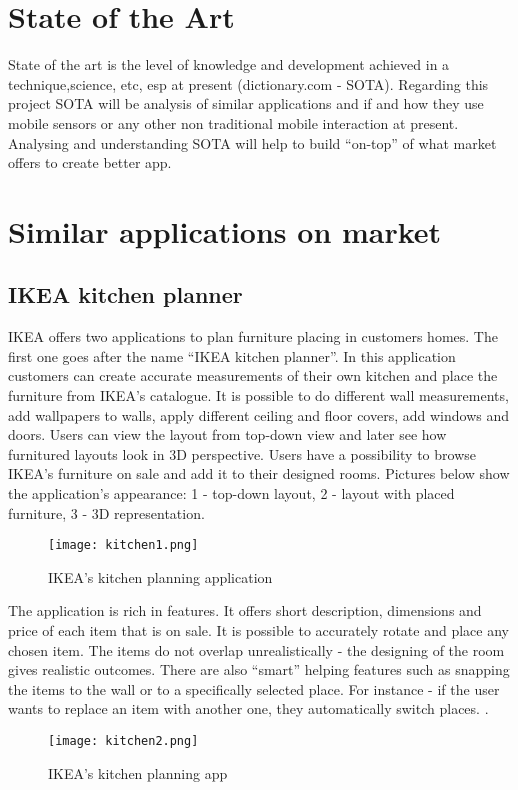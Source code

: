 \section{State of the Art}

State of the art is the level of knowledge and development achieved in a technique,science, etc, esp at present (dictionary.com - SOTA). Regarding this project SOTA will be analysis of similar applications and if and how they use mobile sensors or any other non traditional mobile interaction at present.  Analysing and understanding SOTA will help to build “on-top” of what market offers to create better app. 

\section{Similar applications on market} 
\subsection{IKEA kitchen planner}
IKEA offers two applications to plan furniture placing in customers homes. The first one goes after the name “IKEA kitchen planner”. In this application customers can create accurate measurements of their own kitchen and place the furniture from IKEA’s catalogue. It is possible to do different wall measurements, add wallpapers to walls, apply different ceiling and floor covers, add windows and doors. Users can view the layout from top-down view and later see how furnitured layouts look in 3D perspective.
Users have a possibility to browse IKEA’s furniture on sale and add it to their designed rooms.
Pictures below show the application’s appearance: 1 - top-down layout, 2 - layout with placed furniture, 3 - 3D representation.

\begin{figure}[H]
\centering
\texttt{[image: kitchen1.png]}
\caption{IKEA’s kitchen planning application}
\end{figure}


The application is rich in features. It offers short description, dimensions and price of each item that is on sale. It is possible to accurately rotate and place any chosen item. The items do not overlap unrealistically - the designing of the room gives realistic outcomes. There are also “smart” helping features such as snapping the items to the wall or to a specifically selected place. For instance - if the user wants to replace an item with another one, they automatically switch places.
.
\begin{figure}[H]
\centering
\texttt{[image: kitchen2.png]}
\caption{IKEA’s kitchen planning app}
\end{figure}

